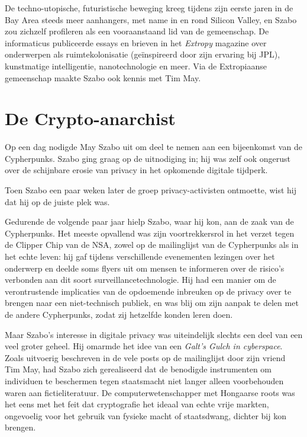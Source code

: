 \documentclass[
  a5paper,
  smalldemyvopaper,11pt,twoside,onecolumn,openright,extrafontsizes,
hidelinks]{memoir}
\begin{document}
De techno-utopische, futuristische beweging kreeg tijdens zijn eerste
jaren in de Bay Area steeds meer aanhangers, met name in en rond Silicon
Valley, en Szabo zou zichzelf profileren als een vooraanstaand lid van
de gemeenschap. De informaticus publiceerde essays en brieven in het
\emph{Extropy} magazine over onderwerpen als ruimtekolonisatie
(geïnspireerd door zijn ervaring bij JPL), kunstmatige intelligentie,
nanotechnologie en meer. Via de Extropiaanse gemeenschap maakte Szabo
ook kennis met Tim May.

\section{De Crypto-anarchist}\label{de-crypto-anarchist}

Op een dag nodigde May Szabo uit om deel te nemen aan een bijeenkomst
van de Cypherpunks. Szabo ging graag op de uitnodiging in; hij was zelf
ook ongerust over de schijnbare erosie van privacy in het opkomende
digitale tijdperk.

Toen Szabo een paar weken later de groep privacy-activisten ontmoette,
wist hij dat hij op de juiste plek was.

Gedurende de volgende paar jaar hielp Szabo, waar hij kon, aan de zaak
van de Cypherpunks. Het meeste opvallend was zijn voortrekkersrol in het
verzet tegen de Clipper Chip van de NSA, zowel op de mailinglijst van de
Cypherpunks als in het echte leven: hij gaf tijdens verschillende
evenementen lezingen over het onderwerp en deelde soms flyers uit om
mensen te informeren over de risico's verbonden aan dit soort
surveillancetechnologie. Hij had een manier om de verontrustende
implicaties van de opdoemende inbreuken op de privacy over te brengen
naar een niet-technisch publiek, en was blij om zijn aanpak te delen met
de andere Cypherpunks, zodat zij hetzelfde konden leren doen.

Maar Szabo's interesse in digitale privacy was uiteindelijk slechts een
deel van een veel groter geheel. Hij omarmde het idee van een
\emph{Galt's Gulch in cyberspace}. Zoals uitvoerig beschreven in de vele
posts op de mailinglijst door zijn vriend Tim May, had Szabo zich
gerealiseerd dat de benodigde instrumenten om individuen te beschermen
tegen staatsmacht niet langer alleen voorbehouden waren aan
fictieliteratuur. De computerwetenschapper met Hongaarse roots was het
eens met het feit dat cryptografie het ideaal van echte vrije markten,
ongevoelig voor het gebruik van fysieke macht of staatsdwang, dichter
bij kon brengen.
\end{document}
